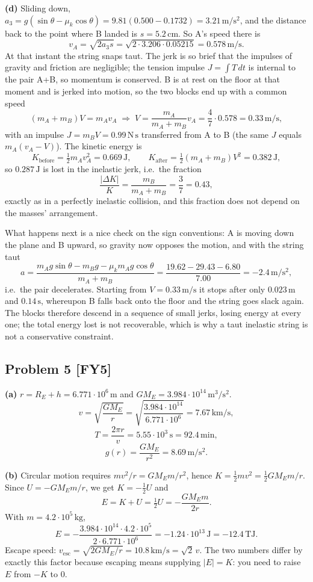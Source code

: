 \documentclass[11pt,a4paper]{article}
\newcommand{\problem}[2]{\subsection*{Problem #1 \; \textnormal{\small[#2]}}}
\newcommand{\unit}[1]{\,\mathrm{#1}}
\begin{document}
\textbf{(d)} Sliding down, $a_3=g(\sin\theta-\mu_k\cos\theta)
=9.81(0.500-0.1732)=3.21\unit{m/s^2}$, and the distance back to the point
where B landed is $s=5.2\unit{cm}$. So A's speed there is
\[
  v_A=\sqrt{2a_3s}=\sqrt{2\cdot3.206\cdot0.05215}
  =\boxed{0.578\unit{m/s}} .
\]
At that instant the string snaps taut. The jerk is so brief that the
impulses of gravity and friction are negligible; the tension impulse
$J=\int T\,dt$ is internal to the pair A+B, so momentum is conserved. B is
at rest on the floor at that moment and is jerked into motion, so the two
blocks end up with a common speed
\[
  (m_A+m_B)V=m_Av_A \;\Longrightarrow\;
  V=\frac{m_A}{m_A+m_B}v_A=\frac47\cdot0.578=\boxed{0.33\unit{m/s}},
\]
with an impulse $J=m_BV=\boxed{0.99\unit{N\,s}}$ transferred from A to B
(the same $J$ equals $m_A(v_A-V)$). The kinetic energy is
\[
  K_{\text{before}}=\tfrac12m_Av_A^2=0.669\unit{J},\qquad
  K_{\text{after}}=\tfrac12(m_A+m_B)V^2=0.382\unit{J},
\]
so $0.287\unit{J}$ is lost in the inelastic jerk, i.e.\ the fraction
\[
  \frac{|\Delta K|}{K}=\frac{m_B}{m_A+m_B}=\frac37=0.43,
\]
exactly as in a perfectly inelastic collision, and this fraction does not
depend on the masses' arrangement.

What happens next is a nice check on the sign conventions: A is moving
down the plane and B upward, so gravity now opposes the motion, and with
the string taut
\[
  a=\frac{m_Ag\sin\theta-m_Bg-\mu_km_Ag\cos\theta}{m_A+m_B}
  =\frac{19.62-29.43-6.80}{7.00}=-2.4\unit{m/s^2},
\]
i.e.\ the pair decelerates. Starting from $V=0.33\unit{m/s}$ it stops
after only $0.023\unit{m}$ and $0.14\unit{s}$, whereupon B falls back onto
the floor and the string goes slack again. The blocks therefore descend in
a sequence of small jerks, losing energy at every one; the total energy lost
is not recoverable, which is why a taut inelastic string is not a
conservative constraint.

\problem{5}{FY5}
\textbf{(a)} $r=R_E+h=6.771\cdot10^{6}\unit{m}$ and
$GM_E=3.984\cdot10^{14}\unit{m^3/s^2}$.
\[
  v=\sqrt{\frac{GM_E}{r}}=\sqrt{\frac{3.984\cdot10^{14}}{6.771\cdot10^{6}}}
  =\boxed{7.67\unit{km/s}},
\]
\[
  T=\frac{2\pi r}{v}=5.55\cdot10^{3}\unit{s}=\boxed{92.4\unit{min}},
\]
\[
  g(r)=\frac{GM_E}{r^2}=\boxed{8.69\unit{m/s^2}}.
\]

\textbf{(b)} Circular motion requires $mv^2/r=GM_Em/r^2$, hence
$K=\tfrac12mv^2=\tfrac12 GM_Em/r$. Since $U=-GM_Em/r$, we get
$K=-\tfrac12U$ and
\[
  E=K+U=\tfrac12U=-\frac{GM_Em}{2r}.
\]
With $m=4.2\cdot10^{5}\unit{kg}$,
\[
  E=-\frac{3.984\cdot10^{14}\cdot4.2\cdot10^{5}}{2\cdot6.771\cdot10^{6}}
  =-1.24\cdot10^{13}\unit{J}
  =\boxed{-12.4\unit{TJ}}.
\]
Escape speed: $v_{\text{esc}}=\sqrt{2GM_E/r}=10.8\unit{km/s}=\sqrt2\,v$.
The two numbers differ by exactly this factor because escaping means
supplying $|E|=K$: you need to raise $E$ from $-K$ to $0$.
\end{document}
